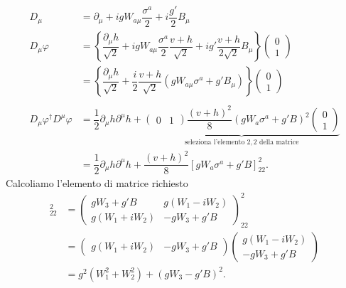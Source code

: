 \documentclass[italian,a4paper]{article}
\theoremstyle{definition}
\newcommand{\dimu}{\ensuremath{\partial_{\mu}}}
\newcommand{\Dimu}{\ensuremath{D_{\mu}}}
\begin{document}
\begin{align*}
    \Dimu &= \dimu + i g W_{a\mu}\dfrac{\sigma^a}{2} + i
    \dfrac{g'}{2}B_\mu\\
    \Dimu \varphi &= \left\{ \dfrac{\dimu h}{\sqrt{2}}
    + i g W_{a\mu}\dfrac{\sigma^a}{2}\dfrac{v + h}{\sqrt{2}}
    + i g' \dfrac{v + h}{2 \sqrt{2}} B_\mu \right\}
    \begin{pmatrix}
        0\\
        1
    \end{pmatrix}\\
    &= \left\{ \dfrac{\dimu h}{\sqrt{2}}
    + \dfrac{i}{2}\dfrac{v + h}{\sqrt{2}}(g W_{a\mu}\sigma^a + g' B_\mu) \right\}
    \begin{pmatrix}
        0\\
        1
    \end{pmatrix}\\
    \\
    D_\mu \varphi^\dagger D^\mu \varphi &=
    \dfrac{1}{2}\partial_\mu h
    \partial^\mu h +
    \underbrace{
    \begin{pmatrix}
        0 & 1
    \end{pmatrix}
    \dfrac{(v + h)^2}{8}
    (g W_a \sigma^a + g' B)^2
    \begin{pmatrix}
        0\\
        1
    \end{pmatrix}
    }_{\text{seleziona l'elemento } 2,2 \text{ della matrice}}\\
    &= 
    \dfrac{1}{2}\partial_\mu h
    \partial^\mu h +
    \dfrac{(v + h)^2}{8}
    [g W_a \sigma^a + g' B]^2_{22}.
\end{align*}
Calcoliamo l'elemento di matrice richiesto
\begin{align*}
    [g W_a \sigma^a + g' B]^2_{22} &= 
    \begin{pmatrix}
        gW_3 + g'B & g(W_1 - iW_2)\\
        g(W_1 + i W_2) & - g W_3 + g'B
    \end{pmatrix}^2_{22}\\
    &= 
    \begin{pmatrix}
        g (W_1 + i W_2) & - g W_3 + g'B
    \end{pmatrix}
    \begin{pmatrix}
        g(W_1 - i W_2)\\
        - g W_3 + g'B
    \end{pmatrix}\\
    &= g^2(W_1^2 + W_2^2) + (gW_3 - g'B)^2.
\end{align*}
\end{document}
